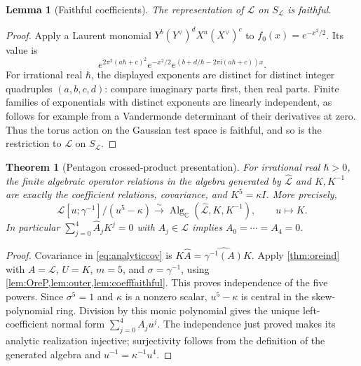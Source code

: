 \documentclass[11pt]{article}
\numberwithin{equation}{section}
\newtheorem{theorem}{Theorem}[section]
\newtheorem{lemma}[lemma]{Lemma}
\theoremstyle{definition}
\theoremstyle{remark}
\newcommand{\C}{\mathbb C}
\newcommand{\ii}{\mathrm i}
\newcommand{\calL}{\mathcal L}
\newcommand{\qh}{\hbar}
\begin{document}
\begin{lemma}[Faithful coefficients]\label{lem:coefffaithful}
The representation of $\calL$ on $S_{\calL}$ is faithful.
\end{lemma}
\begin{proof}
Apply a Laurent monomial
$Y^b(Y^\vee)^dX^a(X^\vee)^c$ to $f_0(x)=e^{-x^2/2}$.
Its value is
\begin{equation}\label{eq:gaussian}
 e^{2\pi^2(a\qh+c)^2}e^{-x^2/2}
 e^{(b+d/\qh-2\pi\ii(a\qh+c))x}.
\end{equation}
For irrational real $\qh$, the displayed exponents are distinct for distinct
integer quadruples $(a,b,c,d)$: compare imaginary parts first, then real
parts. Finite families of exponentials with distinct exponents are linearly
independent, as follows for example from a Vandermonde determinant of their
derivatives at zero. Thus the torus action on the Gaussian test space is
faithful, and so is the restriction to $\calL$ on $S_{\calL}$.
\end{proof}

\begin{theorem}[Pentagon crossed-product presentation]\label{thm:crossed}
For irrational real $\qh>0$, the finite algebraic operator relations in the
algebra generated by $\widehat{\calL}$ and $K,K^{-1}$ are exactly the
coefficient relations, covariance, and $K^5=\kappa I$. More precisely,
\begin{equation}\label{eq:crossed}
 \calL[u;\gamma^{-1}]/(u^5-\kappa)
 \xrightarrow{\sim}
 \operatorname{Alg}_{\C}(\widehat{\calL},K,K^{-1}),
 \qquad u\longmapsto K.
\end{equation}
In particular $\sum_{j=0}^4\widehat A_jK^j=0$ with $A_j\in\calL$ implies
$A_0=\cdots=A_4=0$.
\end{theorem}
\begin{proof}
Covariance in \eqref{eq:analyticcov} is
$K\widehat A=\widehat{\gamma^{-1}(A)}K$.
Apply \cref{thm:oreind} with $A=\calL$, $U=K$, $m=5$, and
$\sigma=\gamma^{-1}$, using \cref{lem:OreP,lem:outer,lem:coefffaithful}.
This proves independence of the five powers.
Since $\sigma^5=1$ and $\kappa$ is a nonzero scalar, $u^5-\kappa$ is central
in the skew-polynomial ring. Division by this monic polynomial gives the
unique left-coefficient normal form $\sum_{j=0}^4 A_ju^j$.
The independence just proved makes its analytic realization injective;
surjectivity follows from the definition of the generated algebra and
$u^{-1}=\kappa^{-1}u^4$.
\end{proof}
\end{document}
